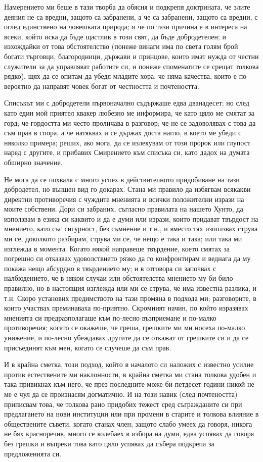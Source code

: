 \documentclass[12pt]{book}
\begin{document}
Намерението ми беше в тази творба да обясня и подкрепя доктрината, че злите деяния не са вредни, защото са забранени, а че са забранени, защото са вредни, с оглед единствено на човешката природа; и че по тази причина е в интереса на всеки, който иска да бъде щастлив в този свят, да бъде добродетелен; и изхождайки от това обстоятелство (понеже винаги има по света голям брой богати търговци, благородници, държави и принцове, които имат нужда от честни служители за да управляват работите си, и понеже споменатите се срещат толкова рядко), щях да се опитам да убедя младите хора, че няма качества, които е по-вероятно да направят човек богат от честността и почтеността. 

Списъкът ми с добродетели първоначално съдържаше едва дванадесет; но след като един мой приятел квакер любезно ме информира, че като цяло ме смятат за горд; че гордостта ми често проличава в разговор; че не се задоволявах с това да съм прав в спора, а че натяквах и се държах доста нагло, в което ме убеди с няколко примера; реших, ако мога, да се излекувам от този пророк или глупост наред с другите, и прибавих Смирението към списъка си, като дадох на думата обширно значение. 

Не мога да се похваля с много успех в действителното придобиване на тази добродетел, но външен вид го докарах. Стана ми правило да избягвам всякакви директни противоречия с чуждите мненията и всички положителни изрази на моите собствени. Дори си забраних, съгласно правилата на нашето Хунто, да използвам в езика си каквито и да е думи или изрази, които придават твърдост на мнението, като със сигурност, без съмнение и т.н., и вместо тях използвах струва ми се, доколкото разбирам, струва ми се, че нещо е така и така; или така ми изглежда в момента. Когато някой направеше твърдение, което смятах за погрешно си отказвах удоволствието рязко да го конфронтирам и веднага да му покажа нещо абсурдно в твърдението му; и в отговора си започвах с налбюдението, че в някои случаи или обстоятелства мнението му би било правилно, но в настоящия изглежда или ми се струва, че има известна разлика, и т.н. Скоро установих предимството на тази промяна в подхода ми; разговорите, в които участвах преминаваха по-приятно. Скромният начин, по който изразявах мненията си предразполагаше към по-лесно възприемане и по-малко противоречия; когато се окажеше, че греша, грешките ми ми носеха по-малко унижение, и по-лесно убеждавах другите да се откажат от грешките си и да се присъединят към мен, когато се случеше да съм прав.

И в крайна сметка, този подход, който в началото си наложих с известно усилие против естествените ми наклонности, в крайна сметка ми стана толкова удобен и така привикнах към него, че през последните може би петдесет години никой не ме е чул да се произнасям догматично. И на този навик (след почтеността) приписвам това, че толкова рано придобих тежест сред съгражданите си при предлагането на нови институции или при промени в старите и толкова влияние в обществените съвети, когато станах член; защото слабо умеех да говоря, никога не бях красноречив, много се колебаех в избора на думи, едва успявах да говоря без грешки и въпреки това като цяло успявах да събера подкрепа за предложенията си.
\end{document}
